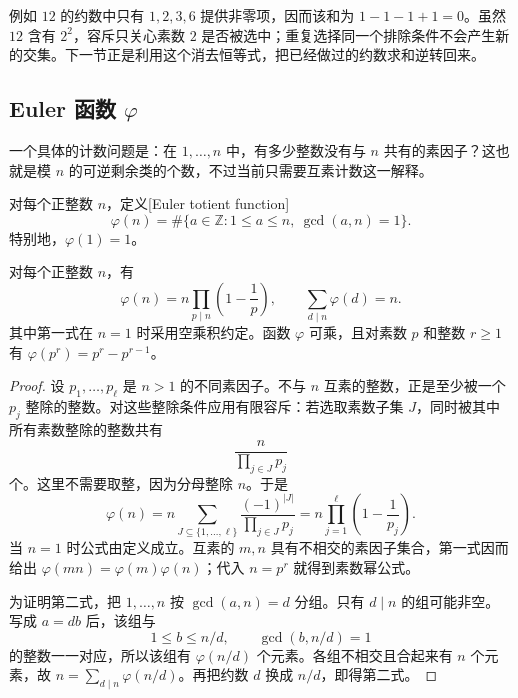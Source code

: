 例如 \(12\) 的约数中只有 \(1,2,3,6\) 提供非零项，因而该和为 \(1-1-1+1=0\)。虽然 \(12\) 含有 \(2^2\)，容斥只关心素数 \(2\) 是否被选中；重复选择同一个排除条件不会产生新的交集。下一节正是利用这个消去恒等式，把已经做过的约数求和逆转回来。

\subsection{Euler 函数 \texorpdfstring{\(\varphi\)}{\AnalysisPdfVarPhi}}
\label{b3:subsec:250104}

一个具体的计数问题是：在 \(1,\ldots,n\) 中，有多少整数没有与 \(n\) 共有的素因子？这也就是模 \(n\) 的可逆剩余类的个数，不过当前只需要互素计数这一解释。

\begin{definition}\label{b3:def:25-totient}
对每个正整数 \(n\)，定义[Euler totient function]
\[
 \varphi(n)=\#\{a\in\mathbb Z:1\le a\le n,\ \gcd(a,n)=1\}.
\]
特别地，\(\varphi(1)=1\)。
\end{definition}

\begin{proposition}
\label{b3:prop:25-totient-identities}
对每个正整数 \(n\)，有
\[
 \varphi(n)=n\prod_{p\mid n}\left(1-\frac1p\right),
 \qquad
 \sum_{d\mid n}\varphi(d)=n.
\]
其中第一式在 \(n=1\) 时采用空乘积约定。函数 \(\varphi\) 可乘，且对素数 \(p\) 和整数 \(r\ge1\) 有 \(\varphi(p^r)=p^r-p^{r-1}\)。
\end{proposition}
\begin{proof}
设 \(p_1,\ldots,p_\ell\) 是 \(n>1\) 的不同素因子。不与 \(n\) 互素的整数，正是至少被一个 \(p_j\) 整除的整数。对这些整除条件应用有限容斥：若选取素数子集 \(J\)，同时被其中所有素数整除的整数共有
\[
 \frac{n}{\prod_{j\in J}p_j}
\]
个。这里不需要取整，因为分母整除 \(n\)。于是
\[
 \varphi(n)
 =n\sum_{J\subseteq\{1,\ldots,\ell\}}
     \frac{(-1)^{|J|}}{\prod_{j\in J}p_j}
 =n\prod_{j=1}^{\ell}\left(1-\frac1{p_j}\right).
\]
当 \(n=1\) 时公式由定义成立。互素的 \(m,n\) 具有不相交的素因子集合，第一式因而给出 \(\varphi(mn)=\varphi(m)\varphi(n)\)；代入 \(n=p^r\) 就得到素数幂公式。

为证明第二式，把 \(1,\ldots,n\) 按 \(\gcd(a,n)=d\) 分组。只有 \(d\mid n\) 的组可能非空。写成 \(a=db\) 后，该组与
\[
 1\le b\le n/d,\qquad \gcd(b,n/d)=1
\]
的整数一一对应，所以该组有 \(\varphi(n/d)\) 个元素。各组不相交且合起来有 \(n\) 个元素，故 \(n=\sum_{d\mid n}\varphi(n/d)\)。再把约数 \(d\) 换成 \(n/d\)，即得第二式。
\end{proof}


